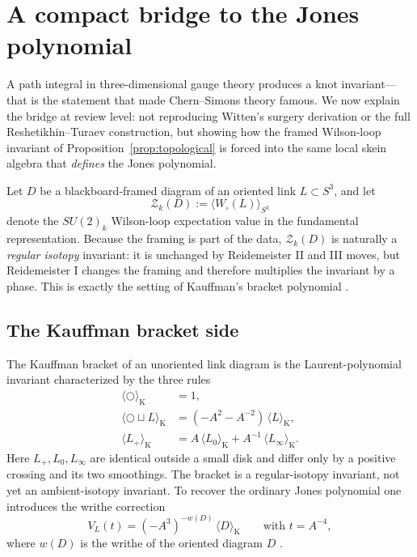 \section{A compact bridge to the Jones polynomial}\label{sec:witten-jones}

A path integral in three-dimensional gauge theory produces a knot invariant---that is the statement that made Chern--Simons theory famous.  We now explain the bridge at review level: not reproducing Witten's surgery derivation or the full Reshetikhin--Turaev construction, but showing how the framed Wilson-loop invariant of Proposition~\ref{prop:topological} is forced into the same local skein algebra that \emph{defines} the Jones polynomial.

\medskip

\noindent Let $D$ be a blackboard-framed diagram of an oriented link $L \subset S^3$, and let
\begin{equation}\label{eq:Zk-diagram}
\mathcal{Z}_k(D)
:=
\bigl\langle W_{\square}(L)\bigr\rangle_{S^3}
\end{equation}
denote the $SU(2)_k$ Wilson-loop expectation value in the fundamental representation. Because the framing is part of the data, $\mathcal{Z}_k(D)$ is naturally a \emph{regular isotopy} invariant: it is unchanged by Reidemeister II and III moves, but Reidemeister I changes the framing and therefore multiplies the invariant by a phase. This is exactly the setting of Kauffman's bracket polynomial \cite{Kauffman1987}.

\subsection{The Kauffman bracket side}

The Kauffman bracket of an unoriented link diagram is the Laurent-polynomial invariant characterized by the three rules
\begin{align}
\langle \bigcirc \rangle_{\mathrm{K}} &= 1, \label{eq:kauffman-unknot} \\[1mm]
\langle \bigcirc \sqcup L \rangle_{\mathrm{K}}
&=
(-A^2-A^{-2})\,\langle L \rangle_{\mathrm{K}}, \label{eq:kauffman-loop} \\[1mm]
\langle L_+ \rangle_{\mathrm{K}}
&=
A\,\langle L_0 \rangle_{\mathrm{K}}
+A^{-1}\,\langle L_\infty \rangle_{\mathrm{K}}. \label{eq:kauffman-skein}
\end{align}
Here $L_+,L_0,L_\infty$ are identical outside a small disk and differ only by a positive crossing and its two smoothings. The bracket is a regular-isotopy invariant, not yet an ambient-isotopy invariant. To recover the ordinary Jones polynomial one introduces the writhe correction
\begin{equation}\label{eq:jones-from-bracket}
V_L(t)
=
(-A^3)^{-w(D)}\,\langle D\rangle_{\mathrm{K}}
\qquad
\text{with }
t=A^{-4},
\end{equation}
where $w(D)$ is the writhe of the oriented diagram $D$ \cite{Kauffman1987}.

